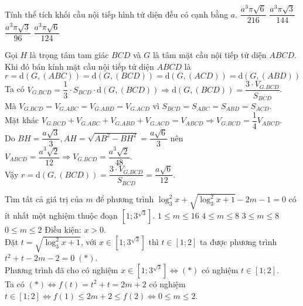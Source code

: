 \begin{ex}%
Tính thể tích khối cầu nội tiếp hình tứ diện đều có cạnh bằng $a$.
\choice
{\True $\dfrac{a^3\pi\sqrt{6}}{216}$}
{$\dfrac{a^3\pi\sqrt{3}}{144}$}
{$\dfrac{a^3\pi\sqrt{3}}{96}$}
{$\dfrac{a^3\pi\sqrt{6}}{124}$}
\loigiai
{
\begin{center}
\end{center}
Gọi $H$ là trọng tâm tam giác $BCD$ và $G$ là tâm mặt cầu nội tiếp tứ diện $ABCD$.\\
Khi đó bán kính mặt cầu nội tiếp tứ diện $ABCD$ là
$$r=\mathrm{d}\left(G,(ABC)\right)=\mathrm{d}\left(G,(BCD)\right)=\mathrm{d}\left(G,(ACD)\right)=\mathrm{d}\left(G,(ABD)\right)$$
Ta có $V_{G.BCD}=\dfrac{1}{3}\cdot S_{BCD}\cdot \mathrm{d}\left(G,(BCD)\right)\Rightarrow \mathrm{d}\left(G,(BCD)\right)=\dfrac{3\cdot V_{G.BCD}}{S_{BCD}}$.\\Mà $V_{G.BCD}=V_{G.ABC}=V_{G.ABD}=V_{G.ACD}$ vì $S_{BCD}=S_{ABC}=S_{ABD}=S_{ACD}$.\\Mặt khác $V_{G.BCD}+V_{G.ABC}+V_{G.ABD}+V_{G.ACD}=V_{ABCD}\Rightarrow V_{G.BCD}=\dfrac{1}{4}V_{ABCD}$.\\Do $BH=\dfrac{a\sqrt{3}}{3}, AH=\sqrt{AB^2-BH^2}=\dfrac{a\sqrt{6}}{3}$ nên $V_{ABCD}=\dfrac{a^3\sqrt{2}}{12}\Rightarrow V_{G.BCD}=\dfrac{a^3\sqrt{2}}{48}$.\\Vậy $r=\mathrm{d}\left(G,(BCD)\right)=\dfrac{3\cdot V_{G.BCD}}{S_{BCD}}=\dfrac{a\sqrt{6}}{12}$.
}
\end{ex}

\begin{ex}%
Tìm tất cả giá trị của $m$ để phương trình $\log_3^2x+\sqrt{\log_3^2x+1}-2m-1=0$ có ít nhất một nghiệm thuộc đoạn $\left[1;3^{\sqrt{3}}\right]$.
\choice
{$1\leq m\leq 16$}
{$4\leq m\leq 8$}
{$3\leq m\leq 8$}
{\True $0\leq m\leq 2$}
\loigiai
{Điều kiện: $x>0$.\\
Đặt $t=\sqrt{\log_3^2x+1}$, với $x\in\left[1;3^{\sqrt{3}}\right]$ thì $t\in\left[1;2\right]$ ta được phương trình $t^2+t-2m-2=0\;(*)$.\\
Phương trình đã cho có nghiệm $x\in\left[1;3^{\sqrt{3}}\right]\Leftrightarrow (*)$ có nghiệm $t\in\left[1;2\right]$.\\
Ta có $(*)\Leftrightarrow f(t)=t^2+t=2m+2$ có nghiệm $t\in\left[1;2\right]\Leftrightarrow f(1)\leq 2m+2\leq f(2)\Leftrightarrow 0\leq m\leq 2$.
}
\end{ex}

